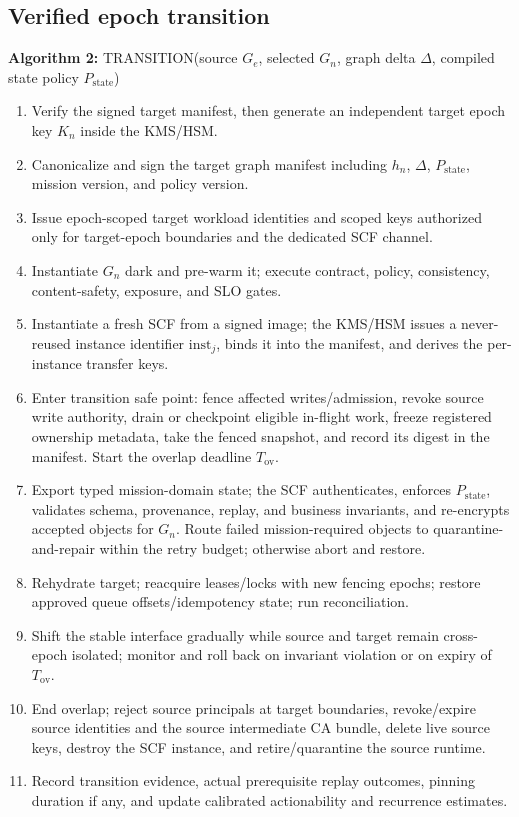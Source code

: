 \documentclass[11pt,letterpaper]{article}
\begin{document}
\subsection{Verified epoch transition}

\noindent\textbf{Algorithm 2:} TRANSITION(source $G_e$, selected $G_n$, graph delta $\Delta$, compiled state policy $P_{\mathrm{state}}$)
\begin{enumerate}[leftmargin=2.2em,itemsep=1pt,label=\arabic*.]
\item Verify the signed target manifest, then generate an independent target epoch key $K_n$ inside the KMS/HSM.
\item Canonicalize and sign the target graph manifest including $h_n$, $\Delta$, $P_{\mathrm{state}}$, mission version, and policy version.
\item Issue epoch-scoped target workload identities and scoped keys authorized only for target-epoch boundaries and the dedicated SCF channel.
\item Instantiate $G_n$ dark and pre-warm it; execute contract, policy, consistency, content-safety, exposure, and SLO gates.
\item Instantiate a fresh SCF from a signed image; the KMS/HSM issues a never-reused instance identifier $\mathrm{inst}_j$, binds it into the manifest, and derives the per-instance transfer keys.
\item Enter transition safe point: fence affected writes/admission, revoke source write authority, drain or checkpoint eligible in-flight work, freeze registered ownership metadata, take the fenced snapshot, and record its digest in the manifest. Start the overlap deadline $T_{\mathrm{ov}}$.
\item Export typed mission-domain state; the SCF authenticates, enforces $P_{\mathrm{state}}$, validates schema, provenance, replay, and business invariants, and re-encrypts accepted objects for $G_n$. Route failed mission-required objects to quarantine-and-repair within the retry budget; otherwise abort and restore.
\item Rehydrate target; reacquire leases/locks with new fencing epochs; restore approved queue offsets/idempotency state; run reconciliation.
\item Shift the stable interface gradually while source and target remain cross-epoch isolated; monitor and roll back on invariant violation or on expiry of $T_{\mathrm{ov}}$.
\item End overlap; reject source principals at target boundaries, revoke/expire source identities and the source intermediate CA bundle, delete live source keys, destroy the SCF instance, and retire/quarantine the source runtime.
\item Record transition evidence, actual prerequisite replay outcomes, pinning duration if any, and update calibrated actionability and recurrence estimates.
\end{enumerate}
\end{document}
